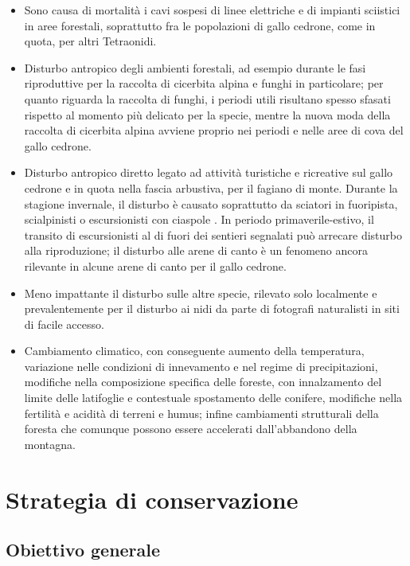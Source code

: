 \documentclass[10pt,twoside,openany,x11names,svgnames,italian,a5paper,dvipsnames,table]{memoir}
\newcommand\chapterillustration{}
\begin{document}
\begin{itemize}
  \item Sono causa di mortalità i  cavi sospesi di linee elettriche e di impianti sciistici in aree forestali, soprattutto fra le popolazioni  di gallo cedrone, come in quota, per altri Tetraonidi.
  \item Disturbo antropico degli ambienti forestali, ad esempio durante le fasi riproduttive per la raccolta di cicerbita alpina e funghi in particolare; per quanto riguarda la raccolta di funghi, i periodi utili risultano spesso sfasati rispetto al momento più delicato per la specie, mentre la nuova moda della raccolta di cicerbita alpina avviene proprio nei periodi e nelle aree di cova del gallo cedrone.
  \item Disturbo antropico diretto legato ad attività turistiche e ricreative sul gallo cedrone e in quota nella fascia arbustiva, per il fagiano di monte. Durante la stagione invernale, il disturbo è causato soprattutto da sciatori in fuoripista, scialpinisti o escursionisti con ciaspole \cite{Arlettaz07} \cite{Brenot96} \cite{Mollet07} \cite{Thiel07}. In periodo primaverile-estivo, il transito di escursionisti al di fuori dei sentieri segnalati può arrecare disturbo alla riproduzione; il disturbo alle arene di canto è un fenomeno ancora rilevante in alcune arene di canto per il gallo cedrone.
  \item Meno impattante il disturbo sulle altre specie, rilevato solo localmente e prevalentemente per il disturbo ai nidi da parte di fotografi naturalisti in siti di facile accesso.
  \item Cambiamento climatico, con conseguente aumento della temperatura, variazione nelle condizioni di innevamento e nel regime di precipitazioni, modifiche nella composizione specifica delle foreste, con innalzamento del limite delle latifoglie e contestuale spostamento delle conifere, modifiche nella fertilità e acidità di terreni e humus; infine cambiamenti strutturali della foresta che comunque possono essere accelerati dall’abbandono della montagna.
\end{itemize}

 
\chapter{Strategia di conservazione}
\renewcommand\chapterillustration{4.JPG}
\section{Obiettivo generale} 
\end{document}
